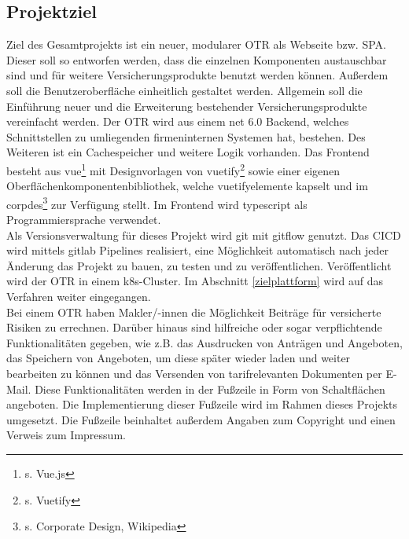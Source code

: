 \subsection{Projektziel}
\label{projektziel}
Ziel des Gesamtprojekts ist ein neuer, modularer \ac{OTR} als Webseite bzw. \ac{SPA}. Dieser soll so entworfen werden, dass die einzelnen Komponenten austauschbar sind und für weitere Versicherungsprodukte benutzt werden können. Außerdem soll die Benutzeroberfläche einheitlich gestaltet werden. Allgemein soll die Einführung neuer und die Erweiterung bestehender Versicherungsprodukte vereinfacht werden. Der \ac{OTR} wird aus einem \gls{net} 6.0 Backend, welches Schnittstellen zu umliegenden firmeninternen Systemen hat, bestehen. Des Weiteren ist ein Cachespeicher und weitere Logik vorhanden. Das Frontend besteht aus \gls{vue}\footnote{s.\cite{Vue2022} Vue.js} mit Designvorlagen von \gls{vuetify}\footnote{s.\cite{Vuetify2022} Vuetify} sowie einer eigenen Oberflächenkomponentenbibliothek, welche \gls{vuetify}elemente kapselt und im \gls{corpdes}\footnote{s.\cite{CorporateDesign2021} Corporate Design, Wikipedia} zur Verfügung stellt. Im Frontend wird \gls{typescript} als Programmiersprache verwendet.\\
Als Versionsverwaltung für dieses Projekt wird \gls{git} mit \gls{gitflow} genutzt. Das \ac{CICD} wird mittels \gls{gitlab} Pipelines realisiert, eine Möglichkeit automatisch nach jeder Änderung das Projekt zu bauen, zu testen und zu veröffentlichen. Veröffentlicht wird der \ac{OTR} in einem \gls{k8s}-Cluster. Im Abschnitt \ref{zielplattform}  wird auf das Verfahren weiter eingegangen.
\\
Bei einem \ac{OTR} haben Makler/-innen die Möglichkeit Beiträge für versicherte Risiken zu errechnen. Darüber hinaus sind hilfreiche oder sogar verpflichtende Funktionalitäten gegeben, wie z.B. das Ausdrucken von Anträgen und Angeboten, das Speichern von Angeboten, um diese später wieder laden und weiter bearbeiten zu können und das Versenden von tarifrelevanten Dokumenten per E-Mail. Diese Funktionalitäten werden in der Fußzeile in Form von Schaltflächen angeboten. Die Implementierung dieser Fußzeile wird im Rahmen dieses Projekts umgesetzt. Die Fußzeile beinhaltet außerdem Angaben zum Copyright und einen Verweis zum Impressum.
\\


